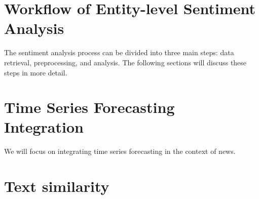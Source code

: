 
\section{Workflow of Entity-level Sentiment Analysis}
\label{sec:workflow-of-sentiment-analysis}
The sentiment analysis process can be divided into three main steps: data retrieval, preprocessing, and analysis. The following sections will discuss these steps in more detail.

\section{Time Series Forecasting Integration}
\label{sec:integration-with-time-series-forecasting-for-market-trends}
We will focus on integrating time series forecasting in the context of news.

\section{Text similarity}
\label{sec:text-similarity}


